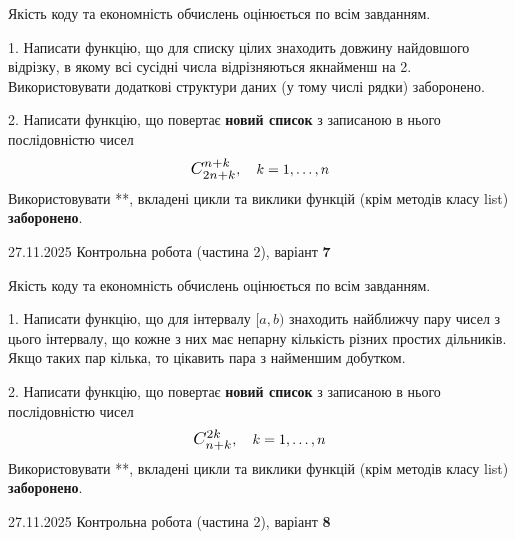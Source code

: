 \documentclass[11pt, ukrainian]{article}
\begin{document}
{{{{{{
\begin {large}
Якість коду та економність обчислень оцінюється по всім завданням.


1. Написати функцію, що для списку цілих знаходить довжину найдовшого відрізку, в якому всі сусідні числа відрізняються якнайменш на 2. Використовувати додаткові структури даних (у тому числі рядки) заборонено.


2. 
Написати функцію, що повертає \textbf{новий список} з записаною в нього послідовністю чисел
$$\scalebox{1.2}{$C_{2n+k}^{n+k}$}, \quad k=1,\ldots,n$$
Використовувати **, вкладені цикли та виклики функцій (крім методів класу list) \textbf{заборонено}.

\end{large}
\newpage
{{27.11.2025 Контрольна робота  (частина 2), варіант  \No \textbf { 7 }\par}}


{
\begin {large}
Якість коду та економність обчислень оцінюється по всім завданням.


1. Написати функцію, що для інтервалу $[a, b)$ знаходить найближчу пару чисел з цього інтервалу, що кожне з них має непарну кількість різних простих дільників. Якщо таких пар кілька, то цікавить пара з найменшим добутком.


2. 
Написати функцію, що повертає \textbf{новий список} з записаною в нього послідовністю чисел
$$\scalebox{1.2}{$C_{n+k}^{2k}$}, \quad k=1,\ldots,n$$
Використовувати **, вкладені цикли та виклики функцій (крім методів класу list) \textbf{заборонено}.

\end{large}
\newpage
{{27.11.2025 Контрольна робота  (частина 2), варіант  \No \textbf { 8 }\par}}

}}}}}}}
\end{document}
